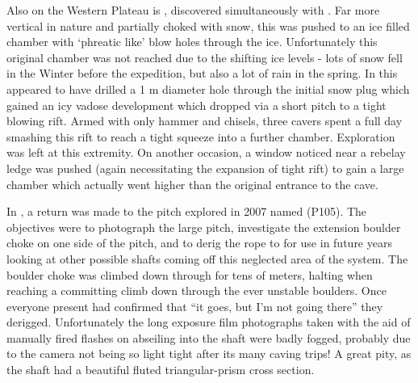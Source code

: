 Also on the Western Plateau is , discovered
simultaneously with . Far more vertical in nature and
partially choked with snow, this was pushed to an ice filled chamber
with `phreatic like' blow holes through the ice. Unfortunately this
original chamber was not reached due to the shifting ice levels - lots
of snow fell in the Winter before the expedition, but also a lot of rain
in the spring. In  this appeared to have drilled a 1 m
diameter hole through the initial snow plug which gained an icy vadose
development which dropped via a short pitch to a tight blowing rift.
Armed with only hammer and chisels, three cavers spent a full day
smashing this rift to reach a tight squeeze into a further chamber.
Exploration was left at this extremity. On another occasion, a window
noticed near a rebelay ledge was pushed (again necessitating the
expansion of tight rift) to gain a large chamber which actually went
higher than the original entrance to the cave.

In , a return was made to the pitch explored in 2007 named
 (P105). The objectives were to photograph the large
pitch, investigate the extension boulder choke on one side of the pitch,
and to derig the rope to  for use in future years looking at
other possible shafts coming off this neglected area of the system. The
boulder choke was climbed down through for tens of meters, halting when
reaching a committing climb down through the ever unstable boulders.
Once everyone present had confirmed that ``it goes, but I'm not going
there'' they derigged. Unfortunately the long exposure film photographs
taken with the aid of manually fired flashes on abseiling into the shaft
were badly fogged, probably due to the camera not being so light tight
after its many caving trips! A great pity, as the shaft had a beautiful
fluted triangular-prism cross section.


